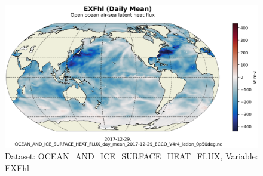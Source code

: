 \begin{figure}[H]
\centering
\includegraphics[scale=0.55]{../images/plots/latlon_plots/Ocean_and_Sea-Ice_Surface_Heat_Fluxes/EXFhl.png}
\caption{Dataset: OCEAN\_AND\_ICE\_SURFACE\_HEAT\_FLUX, Variable: EXFhl}
\label{tab:table-OCEAN_AND_ICE_SURFACE_HEAT_FLUX_EXFhl-Plot}
\end{figure}
\pagebreak
